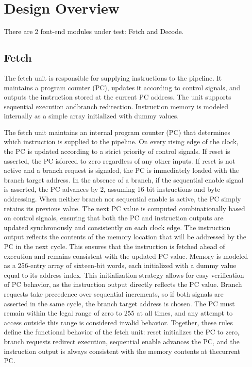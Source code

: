 \chapter{Design Overview} 
\label{cha:design_overview}

There are 2 font-end modules under test: Fetch and Decode.

\section{Fetch}

The fetch unit is responsible for supplying instructions to the pipeline.
It maintains a program counter (PC), updates it according to control signals, and outputs the instruction stored at the current PC address.
The unit supports sequential execution andbranch redirection.
Instruction memory is modeled internally as a simple array initialized with dummy values.

The fetch unit maintains an internal program counter (PC) that determines which instruction is supplied to the pipeline.
On every rising edge of the clock, the PC is updated according to a strict priority of control signals.
If reset is asserted, the PC isforced to zero regardless of any other inputs.
If reset is not active and a branch request is signaled, the PC is immediately loaded with the branch target address.
In the absence of a branch, if the sequential enable signal is asserted, the PC advances by 2, assuming 16-bit instructions and byte addressing.
When neither branch nor sequential enable is active, the PC simply retains its previous value.
The next PC value is computed combinationally based on control signals, ensuring that both the PC and instruction outputs are updated synchronously and consistently on each clock edge.
The instruction output reflects the contents of the memory location that will be addressed by the PC in the next cycle.
This ensures that the instruction is fetched ahead of execution and remains consistent with the updated PC value.
Memory is modeled as a 256‑entry array of sixteen‑bit words, each initialized with a dummy value equal to its address index.
This initialization strategy allows for easy verification of PC behavior, as the instruction output directly reflects the PC value.
Branch requests take precedence over sequential increments, so if both signals are asserted in the same cycle, the branch target address is chosen.
The PC must remain within the legal range of zero to 255 at all times, and any attempt to access outside this range is considered invalid behavior.
Together, these rules define the functional behavior of the fetch unit: reset initializes the PC to zero, branch requests redirect execution, sequential enable advances the PC, and the instruction output is always consistent with the memory contents at thecurrent PC.

